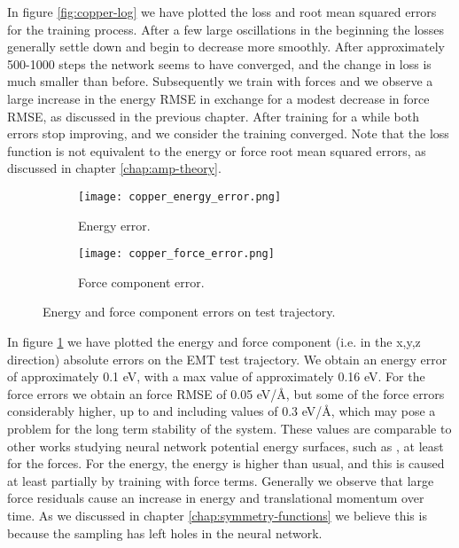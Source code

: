 In figure \ref{fig:copper-log} we have plotted the loss and root mean
squared errors for the training process.
After a few large oscillations in the beginning
the losses generally settle down and begin to decrease
more smoothly.
After approximately 500-1000 steps the network seems to have
converged, and the change in loss is much smaller than before.
Subsequently we train with forces and we observe a large increase
in the energy RMSE in exchange for a modest decrease in force RMSE,
as discussed in the previous chapter.
After training for a while both errors stop improving,
and we consider the training converged.
Note that the loss function is not equivalent to the energy or force
root mean squared errors, as discussed in chapter \ref{chap:amp-theory}.

\begin{figure}[H]
\begin{adjustbox}{max width=1.2\linewidth,center}
\centering
  \begin{subfigure}[b]{0.55\textwidth}
      \texttt{[image: copper\_energy\_error.png]}
      \caption{Energy error.}
  \end{subfigure}
  \hfill
  \begin{subfigure}[b]{0.55\textwidth}
      \texttt{[image: copper\_force\_error.png]}
      \caption{Force component error.}
  \end{subfigure}
\end{adjustbox}
    \caption{Energy and force component errors on test trajectory.}
    \label{fig:copper_error}
\end{figure}

In figure \ref{fig:copper_error} we have plotted the energy and force component
(i.e. in the x,y,z direction)
absolute errors on the EMT test trajectory. We obtain an energy error
of approximately 0.1 eV, with a max value of approximately 0.16 eV.
For the force errors we obtain an force RMSE of 0.05 eV/Å,
but some of the force errors considerably higher, up to
and including values of 0.3 eV/Å, which may pose
a problem for the long term stability of the system.
These values are comparable to other works studying neural network
potential energy surfaces, such as \cite{stende2017constructing}\cite{
    treider2017speeding}\cite{khorshidi2016amp}\cite{PhysRevLett.120.143001},
at least for the forces. For the energy, the energy is higher than usual, and
this is caused at least partially by training with force terms.
Generally we observe that large force residuals cause an increase
in energy and translational momentum over time. As we discussed
in chapter \ref{chap:symmetry-functions} we believe this is because
the sampling has left holes in the neural network.

